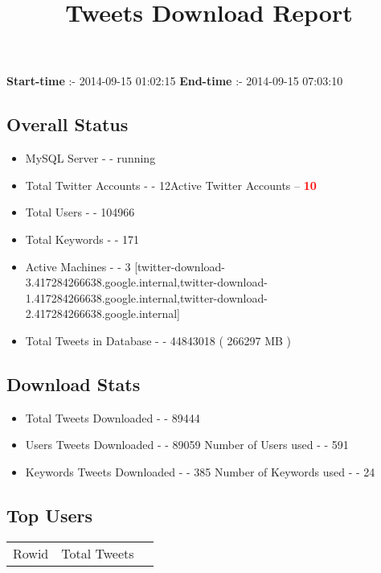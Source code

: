 \documentclass{article}\usepackage[T1]{fontenc}
\begin{document}
\title{\textbf{Tweets Download Report}}
               \date{}
                \maketitle
               \centerline{\textbf{Start-time} :- 2014-09-15 01:02:15 \hspace{40pt} \textbf{End-time} :- 2014-09-15 07:03:10}               \subsection*{Overall Status}                \begin{itemize}                \item MySQL Server - - running               \item Total Twitter Accounts - - 12\newline Active Twitter Accounts -- \textcolor{red}{\textbf{10}}               \item Total Users - - 104966               \item Total Keywords - - 171               \item Active Machines - - 3 [twitter-download-3.417284266638.google.internal,twitter-download-1.417284266638.google.internal,twitter-download-2.417284266638.google.internal]               \item Total Tweets in Database - - 44843018 ( 266297 MB )               \end{itemize}               \subsection*{Download Stats}                \begin{itemize}                \item Total Tweets Downloaded - - 89444               \item Users Tweets Downloaded - - 89059 \newline Number of Users used - - 591               \item Keywords Tweets Downloaded - - 385 \newline Number of Keywords used - - 24              \end{itemize}              \subsection*{Top Users}\begin{tabular}{|c|c|c|}         \hline         Rowid & Total Tweets \\ 

\end{tabular}
\end{document}
